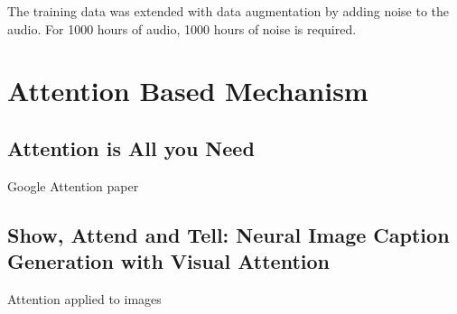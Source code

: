 \documentclass[12pt]{article}
\begin{document}
The training data was extended with data augmentation by adding noise to the audio.
For 1000 hours of audio, 1000 hours of noise is required.


\section{Attention Based Mechanism}
\subsection{Attention is All you Need}
Google Attention paper \cite{Vaswani2017}

\subsection{Show, Attend and Tell: Neural Image Caption Generation with Visual
Attention}
Attention applied to images \cite{Xu2015}




\end{document}

